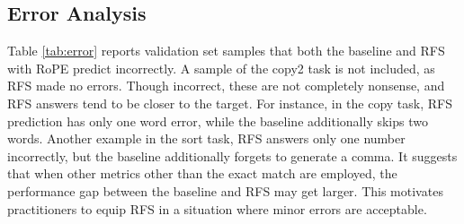 \documentclass[11pt]{article}
\begin{document}
\subsection{Error Analysis}\label{subsec:error}
Table \ref{tab:error} reports validation set samples that both the baseline and RFS with RoPE predict incorrectly. A sample of the copy2 task is not included, as RFS made no errors. Though incorrect, these are not completely nonsense, and RFS answers tend to be closer to the target. For instance, in the copy task, RFS prediction has only one word error, while the baseline additionally skips two words. Another example in the sort task, RFS answers only one number incorrectly, but the baseline additionally forgets to generate a comma. It suggests that when other metrics other than the exact match are employed, the performance gap between the baseline and RFS may get larger. This motivates practitioners to equip RFS in a situation where minor errors are acceptable.
\end{document}
